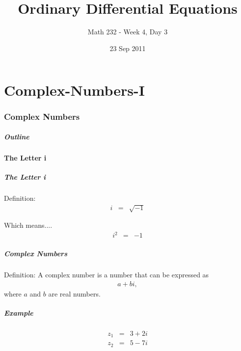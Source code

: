 \part{Complex-Numbers-I}
\section{Complex Numbers}

\title{Ordinary Differential Equations}
\subtitle{Math 232 - Week 4, Day 3}
\date{23 Sep 2011}

\begin{frame}
  \titlepage
\end{frame}

\begin{frame}
  \frametitle{Outline}
\end{frame}


\subsection{The Letter i}


\begin{frame}
  \frametitle{The Letter i}

  Definition: 
  \begin{eqnarray*}
    i & = & \sqrt{-1} 
  \end{eqnarray*}

  Which means....
  \begin{eqnarray*}
    i^2 & = & -1
  \end{eqnarray*}

\end{frame}


\begin{frame}
  \frametitle{Complex Numbers}

  Definition: A complex number is a  number that can be expressed as
  \begin{eqnarray*}
    a + bi,
  \end{eqnarray*}
  where $a$ and $b$ are real numbers.

\end{frame}



\begin{frame}
  \frametitle{Example}

  \begin{eqnarray*}
    z_1 & = & 3 + 2i \\
    z_2 & = & 5 - 7i
  \end{eqnarray*}

\end{frame}


